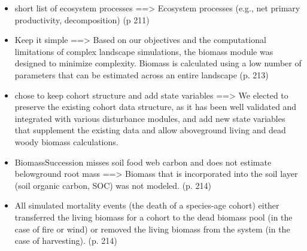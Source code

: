 \documentclass[twoside]{article}	                         %
\begin{document}
\citep{scheller_forest_2004}
\begin{itemize}
  \item short list of ecosystem processes ==> Ecosystem processes (e.g., net primary productivity, decomposition) (p 211)
  \item Keep it simple ==> Based on our objectives and the computational limitations of complex landscape simulations, the biomass module was designed to minimize complexity. Biomass is calculated using a low number of parameters that can be estimated across an entire landscape (p. 213)
  \item chose to keep cohort structure and add state variables ==> We elected to preserve the existing cohort data structure, as it has been well validated and integrated with various disturbance modules, and add new state variables that supplement the existing data and allow aboveground living and dead woody biomass calculations.
  \item BiomassSuccession misses soil food web carbon and does not estimate belowground root mass ==> Biomass that is incorporated into the soil layer (soil organic carbon, SOC) was not modeled. (p. 214)
  \item All simulated mortality events (the death of a species-age cohort) either transferred the living biomass for a cohort to the dead biomass pool (in the case of fire or wind) or removed the living biomass from the system (in the case of harvesting). (p. 214)
  

\end{itemize}
\end{document}

